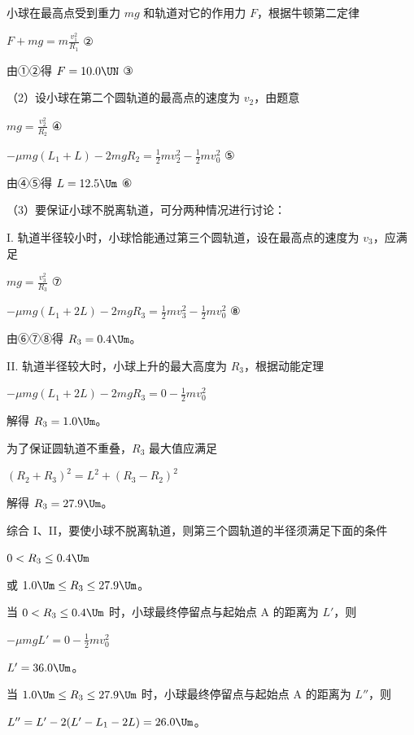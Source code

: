 \documentclass[\gkver]{gaokaozhenti}
\begin{document}
\begin{enumerate}
{小球在最高点受到重力 $mg$ 和轨道对它的作用力 $F$，根据牛顿第二定律

$F+mg=m\frac{v_{1}^{2}}{R_{1}}$ ②

由①②得 $F=10.0\UN$ ③

（2）设小球在第二个圆轨道的最高点的速度为 $v_{2}$，由题意

$mg=\frac{v_{2}^{2}}{R_{2}}$ ④

$-\mu mg\left(L_{1}+L\right)-2mgR_{2}=\frac{1}{2}mv_{2}^{2}-\frac{1}{2}mv_{0}^{2}$ ⑤

由④⑤得 $L=12.5\Um$ ⑥

（3）要保证小球不脱离轨道，可分两种情况进行讨论：

I. 轨道半径较小时，小球恰能通过第三个圆轨道，设在最高点的速度为 $v_{3}$，应满足

$mg=\frac{v_{3}^{2}}{R_{3}}$ ⑦

$-\mu mg\left(L_{1}+2L\right)-2mgR_{3}=\frac{1}{2}mv_{3}^{2}-\frac{1}{2}mv_{0}^{2}$ ⑧

由⑥⑦⑧得 $R_{3}=0.4\Um$。

II. 轨道半径较大时，小球上升的最大高度为 $R_{3}$，根据动能定理

$-\mu mg\left(L_{1}+2L\right)-2mgR_{3}=0-\frac{1}{2}mv_{0}^{2}$

解得 $R_{3}=1.0\Um$。

为了保证圆轨道不重叠，$R_{3}$ 最大值应满足

$\left(R_{2}+R_{3}\right)^{2}=L^{2}+\left(R_{3}-R_{2}\right)^{2}$

解得 $R_{3}=27.9\Um$。

综合 I、II，要使小球不脱离轨道，则第三个圆轨道的半径须满足下面的条件

$0<R_{3}\leq0.4\Um$

或 $1.0\Um\leq R_{3}\leq27.9\Um$。

当 $0<R_{3}\leq0.4\Um$ 时，小球最终停留点与起始点 A 的距离为 $L'$，则

$-\mu mgL'=0-\frac{1}{2}mv_{0}^{2}$

$L'=36.0\Um$。

当 $1.0\Um\leq R_{3}\leq27.9\Um$ 时，小球最终停留点与起始点 A 的距离为 $L''$，则

$L''=L'-2(L'-L_{1}-2L)=26.0\Um$。

}

\end{enumerate}
\end{document}
